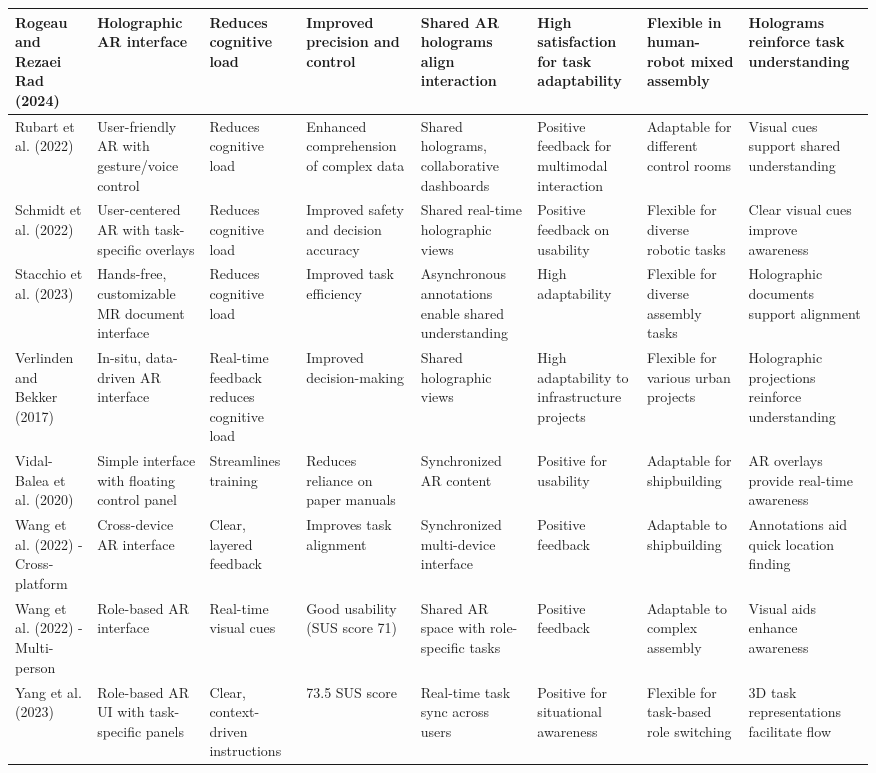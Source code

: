 {\begin{landscape}
\begin{longtable}{@{}p{1.8cm}p{1.8cm}p{1.8cm}p{1.8cm}p{1.8cm}p{1.8cm}p{1.8cm}p{1.8cm}@{}}
\midrule
Rogeau and Rezaei Rad (2024) & Holographic AR interface & Reduces cognitive load & Improved precision and control & Shared AR holograms align interaction & High satisfaction for task adaptability & Flexible in human-robot mixed assembly & Holograms reinforce task understanding \\
\midrule
Rubart et al. (2022) & User-friendly AR with gesture/voice control & Reduces cognitive load & Enhanced comprehension of complex data & Shared holograms, collaborative dashboards & Positive feedback for multimodal interaction & Adaptable for different control rooms & Visual cues support shared understanding \\
\midrule
Schmidt et al. (2022) & User-centered AR with task-specific overlays & Reduces cognitive load & Improved safety and decision accuracy & Shared real-time holographic views & Positive feedback on usability & Flexible for diverse robotic tasks & Clear visual cues improve awareness \\
\midrule
Stacchio et al. (2023) & Hands-free, customizable MR document interface & Reduces cognitive load & Improved task efficiency & Asynchronous annotations enable shared understanding & High adaptability & Flexible for diverse assembly tasks & Holographic documents support alignment \\
\midrule
Verlinden and Bekker (2017) & In-situ, data-driven AR interface & Real-time feedback reduces cognitive load & Improved decision-making & Shared holographic views & High adaptability to infrastructure projects & Flexible for various urban projects & Holographic projections reinforce understanding \\
\midrule
Vidal-Balea et al. (2020) & Simple interface with floating control panel & Streamlines training & Reduces reliance on paper manuals & Synchronized AR content & Positive for usability & Adaptable for shipbuilding & AR overlays provide real-time awareness \\
\midrule
Wang et al. (2022) - Cross-platform & Cross-device AR interface & Clear, layered feedback & Improves task alignment & Synchronized multi-device interface & Positive feedback & Adaptable to shipbuilding & Annotations aid quick location finding \\
\midrule
Wang et al. (2022) - Multi-person & Role-based AR interface & Real-time visual cues & Good usability (SUS score 71) & Shared AR space with role-specific tasks & Positive feedback & Adaptable to complex assembly & Visual aids enhance awareness \\

Yang et al. (2023) & Role-based AR UI with task-specific panels & Clear, context-driven instructions & 73.5 SUS score & Real-time task sync across users & Positive for situational awareness & Flexible for task-based role switching & 3D task representations facilitate flow \\
\end{longtable}
\end{landscape}
\clearpage
} 